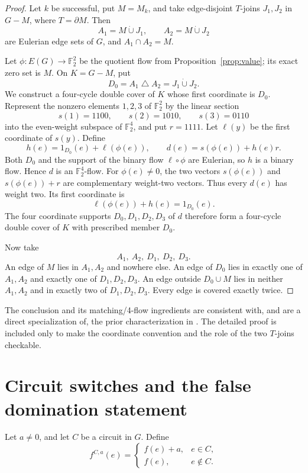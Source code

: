 \documentclass[11pt]{article}
\theoremstyle{definition}
\theoremstyle{remark}
\newcommand{\F}{\mathbb F}
\newcommand{\bd}{\partial}
\begin{document}
\begin{proof}
Let \(k\) be successful, put \(M=M_k\), and take edge-disjoint
\(T\)-joins \(J_1,J_2\) in \(G-M\), where \(T=\bd M\).  Then
\[
 A_1=M\mathbin{\dot\cup}J_1,\qquad
 A_2=M\mathbin{\dot\cup}J_2
\]
are Eulerian edge sets of \(G\), and \(A_1\cap A_2=M\).

Let \(\phi:E(G)\to\F_2^2\) be the quotient flow from
Proposition~\ref{prop:value}; its exact zero set is \(M\).  On
\(K=G-M\), put
\[
 D_0=A_1\mathbin{\triangle}A_2=J_1\mathbin{\dot\cup}J_2.
\]
We construct a four-cycle double cover of \(K\) whose first coordinate is
\(D_0\).  Represent the nonzero elements \(1,2,3\) of \(\F_2^2\) by the
linear section
\[
 s(1)=1100,\qquad s(2)=1010,\qquad s(3)=0110
\]
into the even-weight subspace of \(\F_2^4\), and put \(r=1111\).  Let
\(\ell(y)\) be the first coordinate of \(s(y)\).  Define
\[
 h(e)=1_{D_0}(e)+\ell(\phi(e)),\qquad
 d(e)=s(\phi(e))+h(e)r.                            \tag{5}
\]
Both \(D_0\) and the support of the binary flow \(\ell\circ\phi\) are
Eulerian, so \(h\) is a binary flow.  Hence \(d\) is an
\(\F_2^4\)-flow.  For \(\phi(e)\ne0\), the two vectors
\(s(\phi(e))\) and \(s(\phi(e))+r\) are complementary weight-two
vectors.  Thus every \(d(e)\) has weight two.  Its first coordinate is
\[
 \ell(\phi(e))+h(e)=1_{D_0}(e).
\]
The four coordinate supports \(D_0,D_1,D_2,D_3\) of \(d\) therefore form
a four-cycle double cover of \(K\) with prescribed member \(D_0\).

Now take
\[
 A_1,\ A_2,\ D_1,\ D_2,\ D_3.
\]
An edge of \(M\) lies in \(A_1,A_2\) and nowhere else.  An edge of
\(D_0\) lies in exactly one of \(A_1,A_2\) and exactly one of
\(D_1,D_2,D_3\).  An edge outside \(D_0\cup M\) lies in neither
\(A_1,A_2\) and in exactly two of \(D_1,D_2,D_3\).  Every edge is covered
exactly twice.
\end{proof}

The conclusion and its matching/4-flow ingredients are consistent with,
and are a direct specialization of, the prior characterization in
\cite{hoffmann2013}.  The detailed proof is included only to make the
coordinate convention and the role of the two \(T\)-joins checkable.

\section{Circuit switches and the false domination statement}
\label{sec:switch}

Let \(a\ne0\), and let \(C\) be a circuit in \(G\).  Define
\[
 f^{C,a}(e)=
 \begin{cases}
   f(e)+a,&e\in C,\\
   f(e),&e\notin C.
 \end{cases}                                       \tag{6}
\]
\end{document}
